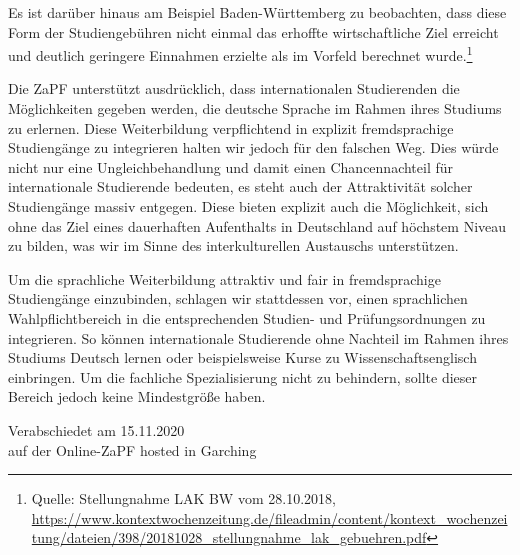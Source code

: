 \documentclass[a4paper]{scrartcl}
\begin{document}
Es ist darüber hinaus am Beispiel Baden-Württemberg zu beobachten, dass diese Form der Studiengebühren nicht einmal das erhoffte wirtschaftliche Ziel erreicht und deutlich geringere Einnahmen erzielte als im Vorfeld berechnet wurde.\footnote{Quelle: Stellungnahme LAK BW vom 28.10.2018, \url{https://www.kontextwochenzeitung.de/fileadmin/content/kontext_wochenzeitung/dateien/398/20181028_stellungnahme_lak_gebuehren.pdf}}

Die ZaPF unterstützt ausdrücklich, dass internationalen Studierenden die Möglichkeiten gegeben werden, die deutsche Sprache im Rahmen ihres Studiums zu erlernen. Diese Weiterbildung verpflichtend in explizit fremdsprachige Studiengänge zu integrieren halten wir jedoch für den falschen Weg. Dies würde nicht nur eine Ungleichbehandlung und damit einen Chancennachteil für internationale Studierende bedeuten, es steht auch der Attraktivität solcher Studiengänge massiv entgegen. Diese bieten explizit auch die Möglichkeit, sich ohne das Ziel eines dauerhaften Aufenthalts in Deutschland auf höchstem Niveau zu bilden, was wir im Sinne des interkulturellen Austauschs unterstützen. 

Um die sprachliche Weiterbildung attraktiv und fair in fremdsprachige Studiengänge einzubinden, schlagen wir stattdessen vor, einen sprachlichen Wahlpflichtbereich in die entsprechenden Studien- und Prüfungsordnungen zu integrieren. So können internationale Studierende ohne Nachteil im Rahmen ihres Studiums Deutsch lernen oder beispielsweise Kurse zu Wissenschaftsenglisch einbringen. Um die fachliche Spezialisierung nicht zu behindern, sollte dieser Bereich jedoch keine Mindestgröße haben.

\vspace*{\fill}
\begin{flushright}
	Verabschiedet am 15.11.2020\\
	auf der Online-ZaPF hosted in Garching
\end{flushright}
\end{document}
